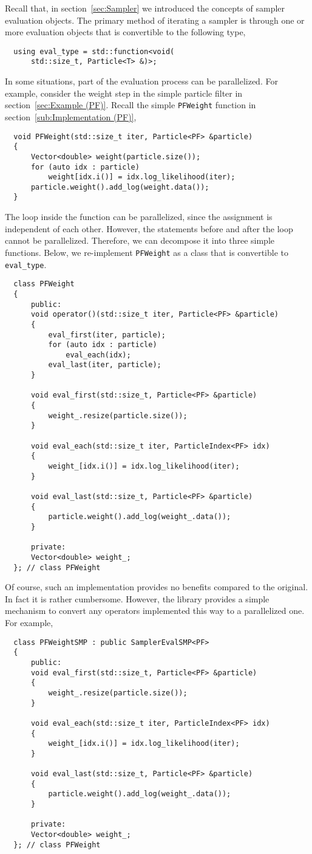 Recall that, in section~\ref{sec:Sampler} we introduced the concepts of sampler
evaluation objects. The primary method of iterating a sampler is through
one or more evaluation objects that is convertible to the following type,
\begin{Verbatim}
  using eval_type = std::function<void(
      std::size_t, Particle<T> &)>;
\end{Verbatim}
In some situations, part of the evaluation process can be parallelized. For
example, consider the weight step in the simple particle filter in
section~\ref{sec:Example (PF)}. Recall the simple \verb|PFWeight| function in
section~\ref{sub:Implementation (PF)},
\begin{Verbatim}
  void PFWeight(std::size_t iter, Particle<PF> &particle)
  {
      Vector<double> weight(particle.size());
      for (auto idx : particle)
          weight[idx.i()] = idx.log_likelihood(iter);
      particle.weight().add_log(weight.data());
  }
\end{Verbatim}
The loop inside the function can be parallelized, since the assignment is
independent of each other. However, the statements before and after the loop
cannot be parallelized. Therefore, we can decompose it into three simple
functions. Below, we re-implement \verb|PFWeight| as a class that is
convertible to \verb|eval_type|.
\begin{Verbatim}
  class PFWeight
  {
      public:
      void operator()(std::size_t iter, Particle<PF> &particle)
      {
          eval_first(iter, particle);
          for (auto idx : particle)
              eval_each(idx);
          eval_last(iter, particle);
      }

      void eval_first(std::size_t, Particle<PF> &particle)
      {
          weight_.resize(particle.size());
      }

      void eval_each(std::size_t iter, ParticleIndex<PF> idx)
      {
          weight_[idx.i()] = idx.log_likelihood(iter);
      }

      void eval_last(std::size_t, Particle<PF> &particle)
      {
          particle.weight().add_log(weight_.data());
      }

      private:
      Vector<double> weight_;
  }; // class PFWeight
\end{Verbatim}
Of course, such an implementation provides no benefits compared to the
original. In fact it is rather cumbersome. However, the library provides a
simple mechanism to convert any operators implemented this way to a
parallelized one. For example,
\begin{Verbatim}
  class PFWeightSMP : public SamplerEvalSMP<PF>
  {
      public:
      void eval_first(std::size_t, Particle<PF> &particle)
      {
          weight_.resize(particle.size());
      }

      void eval_each(std::size_t iter, ParticleIndex<PF> idx)
      {
          weight_[idx.i()] = idx.log_likelihood(iter);
      }

      void eval_last(std::size_t, Particle<PF> &particle)
      {
          particle.weight().add_log(weight_.data());
      }

      private:
      Vector<double> weight_;
  }; // class PFWeight
\end{Verbatim}

